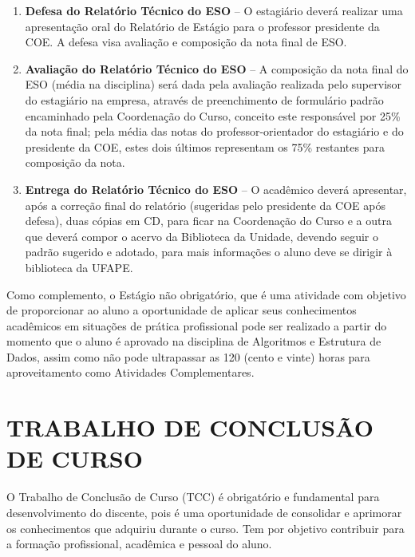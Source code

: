 \documentclass[
	12pt,				%
	openright,			%
  oneside,     %
	a4paper,			%
	chapter=TITLE,		%
	english,			%
	french,				%
	spanish,			%
	brazil				%
	]{abntex2}
\begin{document}
\begin{enumerate}
    \item \textbf{Defesa do Relatório Técnico do ESO} – O estagiário deverá realizar uma apresentação oral do Relatório de Estágio para o professor presidente da COE. A defesa visa avaliação e composição da nota final de ESO.
    \item \textbf{Avaliação do Relatório Técnico do ESO} – A composição da nota final do ESO (média na disciplina) será dada pela avaliação realizada pelo supervisor do estagiário na empresa, através de preenchimento de formulário padrão encaminhado pela Coordenação do Curso, conceito este responsável por 25\% da nota final; pela média das notas do professor-orientador do estagiário e do presidente da COE, estes dois últimos representam os 75\% restantes para composição da nota.
    \item \textbf{Entrega do Relatório Técnico do ESO} – O acadêmico deverá apresentar, após a correção final do relatório (sugeridas pelo presidente da COE após defesa), duas cópias em CD, para ficar na Coordenação do Curso e a outra que deverá compor o acervo da Biblioteca da Unidade, devendo seguir o padrão sugerido e adotado, para mais informações o aluno deve se dirigir à biblioteca da UFAPE.
\end{enumerate}

Como complemento, o Estágio não obrigatório, que é uma atividade com objetivo de proporcionar ao aluno a oportunidade de aplicar seus conhecimentos acadêmicos em situações de prática profissional pode ser realizado a partir do momento que o aluno é aprovado na disciplina de Algoritmos e Estrutura de Dados, assim como não pode ultrapassar as 120 (cento e vinte) horas para aproveitamento como Atividades Complementares.




%
%



\chapter{TRABALHO DE CONCLUSÃO DE CURSO}

O Trabalho de Conclusão de Curso (TCC) é obrigatório e fundamental para desenvolvimento do discente, pois é uma oportunidade de consolidar e aprimorar os conhecimentos que adquiriu durante o curso. Tem por objetivo contribuir para a formação profissional, acadêmica e pessoal do aluno.
\end{document}
